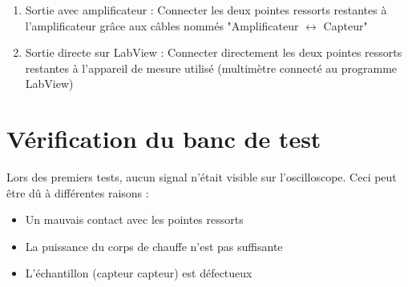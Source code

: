\begin{enumerate}
    \item Sortie avec amplificateur : Connecter les deux pointes ressorts restantes à l'amplificateur grâce aux câbles nommés "Amplificateur
          $\leftrightarrow$ Capteur"\\
          
    \item Sortie directe sur LabView : Connecter directement les deux pointes ressorts restantes à l'appareil de mesure utilisé (multimètre
          connecté au programme LabView)
\end{enumerate}

\section{Vérification du banc de test}
Lors des premiers tests, aucun signal n'était visible sur l'oscilloscope. Ceci peut être dû à différentes raisons :
\begin{itemize}
    \item Un mauvais contact avec les pointes ressorts\\
          
    \item La puissance du corps de chauffe n'est pas suffisante\\
          
    \item L'échantillon (capteur \gls{capteur}) est défectueux\\
\end{itemize}


